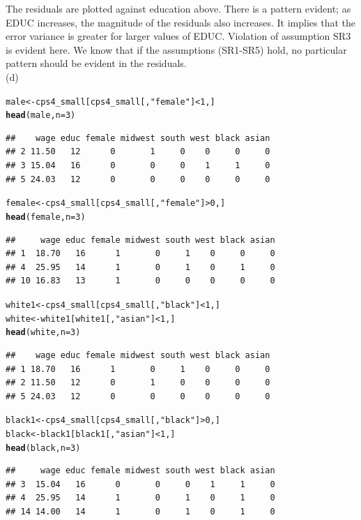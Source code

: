 \documentclass[a4paper]{article}\usepackage{graphicx, color}
\makeatletter
\newcommand{\hlfunctioncall}[1]{\textcolor[rgb]{0.501960784313725,0,0.329411764705882}{\textbf{#1}}}%
\newcommand{\hlstring}[1]{\textcolor[rgb]{0.6,0.6,1}{#1}}%
\newenvironment{kframe}{%
 \def\at@end@of@kframe{}%
 \ifinner\ifhmode%
  \def\at@end@of@kframe{\end{minipage}}%
  \begin{minipage}{\columnwidth}%
 \fi\fi%
 \def\FrameCommand##1{\hskip\@totalleftmargin \hskip-\fboxsep
 \colorbox{shadecolor}{##1}\hskip-\fboxsep
     \hskip-\linewidth \hskip-\@totalleftmargin \hskip\columnwidth}%
 \MakeFramed {\advance\hsize-\width
   \@totalleftmargin\z@ \linewidth\hsize
   \@setminipage}}%
 {\par\unskip\endMakeFramed%
 \at@end@of@kframe}
\newenvironment{knitrout}{}{} %
\makeatother
\begin{document}
The residuals are plotted against education above. There is a pattern evident; as EDUC increases, the magnitude of the residuals also increases. It implies that the error
variance is greater for larger values of EDUC. Violation of assumption SR3 is evident here. We know that if the assumptions (SR1-SR5) hold, no particular pattern should be evident in the residuals.\\


(d)
\begin{knitrout}
\color{fgcolor}\begin{kframe}
\begin{alltt}
male <- cps4_small[cps4_small[, \hlstring{"female"}] < 1, ]
\hlfunctioncall{head}(male, n = 3)
\end{alltt}
\begin{verbatim}
##    wage educ female midwest south west black asian
## 2 11.50   12      0       1     0    0     0     0
## 3 15.04   16      0       0     0    1     1     0
## 5 24.03   12      0       0     0    0     0     0
\end{verbatim}
\begin{alltt}

female <- cps4_small[cps4_small[, \hlstring{"female"}] > 0, ]
\hlfunctioncall{head}(female, n = 3)
\end{alltt}
\begin{verbatim}
##     wage educ female midwest south west black asian
## 1  18.70   16      1       0     1    0     0     0
## 4  25.95   14      1       0     1    0     1     0
## 10 16.83   13      1       0     0    0     0     0
\end{verbatim}
\begin{alltt}

white1 <- cps4_small[cps4_small[, \hlstring{"black"}] < 1, ]
white <- white1[white1[, \hlstring{"asian"}] < 1, ]
\hlfunctioncall{head}(white, n = 3)
\end{alltt}
\begin{verbatim}
##    wage educ female midwest south west black asian
## 1 18.70   16      1       0     1    0     0     0
## 2 11.50   12      0       1     0    0     0     0
## 5 24.03   12      0       0     0    0     0     0
\end{verbatim}
\begin{alltt}

black1 <- cps4_small[cps4_small[, \hlstring{"black"}] > 0, ]
black <- black1[black1[, \hlstring{"asian"}] < 1, ]
\hlfunctioncall{head}(black, n = 3)
\end{alltt}
\begin{verbatim}
##     wage educ female midwest south west black asian
## 3  15.04   16      0       0     0    1     1     0
## 4  25.95   14      1       0     1    0     1     0
## 14 14.00   14      1       0     1    0     1     0
\end{verbatim}
\begin{alltt}



\end{alltt}
\end{kframe}
\end{knitrout}
\end{document}
